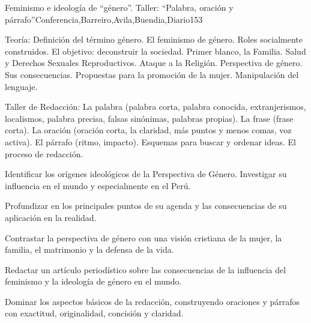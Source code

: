 \begin{syllabus}
\begin{unit}{Feminismo e ideología de ``género''. Taller: ``Palabra, oración y párrafo''}{Conferencia,Barreiro,Avila,Buendia,Diario}{15}{3}
\begin{topics}
	\item Teoría: 
		\subitem Definición del término género. El feminismo de género. Roles socialmente construidos. El objetivo: deconstruir la sociedad. Primer blanco, la Familia. Salud y Derechos Sexuales Reproductivos. Ataque a la Religión.
		\subitem Perspectiva de género. Sus consecuencias. Propuestas para la promoción de la mujer.
		\subitem Manipulación del lenguaje.

	\item Taller de Redacción:
 		\subitem La palabra (palabra corta, palabra conocida, extranjerismos, localismos, palabra precisa, falsas sinónimas, palabras propias).
 		\subitem La frase (frase corta).
 		\subitem La oración (oración corta, la claridad, más puntos y menos comas, voz activa).
 		\subitem El párrafo (ritmo, impacto). 
 		\subitem Esquemas para buscar y ordenar ideas.
 		\subitem El proceso de redacción.
\end{topics}
\begin{learningoutcomes}
	\item Identificar los orígenes ideológicos de la Perspectiva de Género. Investigar su influencia en el mundo y especialmente en el Perú. 	
	\item Profundizar en los principales puntos de su agenda y las consecuencias de su aplicación en la realidad. 	
	\item Contrastar la perspectiva de género con una visión cristiana de la mujer, la familia, el matrimonio y la defensa de la vida.
	\item Redactar un artículo periodístico sobre las consecuencias de la influencia del feminismo y la ideología de género en el mundo. 	
	\item Dominar los aspectos básicos de la redacción, construyendo oraciones y párrafos con exactitud, originalidad, concisión y claridad.

\end{learningoutcomes}
\end{unit}


\end{syllabus}
